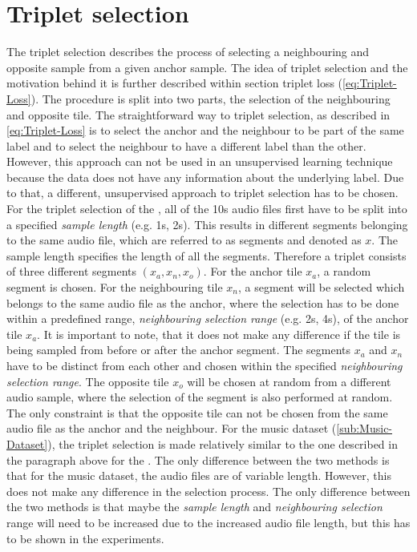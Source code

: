 \section{Triplet selection}
\label{sec:Triplet-Selection}
The triplet selection describes the process of selecting a neighbouring and opposite sample from a given anchor sample. The idea of triplet selection and the motivation behind it is further described within section triplet loss (\ref{eq:Triplet-Loss}). The procedure is split into two parts, the selection of the neighbouring and opposite tile.
\newline
\newline
The straightforward way to triplet selection, as described in \ref{eq:Triplet-Loss} is to select the anchor and the neighbour to be part of the same label and to select the neighbour to have a different label than the other. However, this approach can not be used in an unsupervised learning technique because the data does not have any information about the underlying label. Due to that, a different, unsupervised approach to triplet selection has to be chosen.
\newline
\newline
For the triplet selection of the , all of the 10s audio files first have to be split into a specified \textit{sample length} (e.g. 1s, 2s). This results in different segments belonging to the same audio file, which are referred to as segments and denoted as $x$. The sample length specifies the length of all the segments. Therefore a triplet consists of three different segments $(x_a, x_n, x_o)$.
\newline
For the anchor tile $x_a$, a random segment is chosen. For the neighbouring tile $x_n$, a segment will be selected which belongs to the same audio file as the anchor, where the selection has to be done within a predefined range, \textit{neighbouring selection range} (e.g. 2s, 4s), of the anchor tile $x_a$. It is important to note, that it does not make any difference if the tile is being sampled from before or after the anchor segment. The segments $x_a$ and $x_n$ have to be distinct from each other and chosen within the specified \textit{neighbouring selection range}.
\newline
The opposite tile $x_o$ will be chosen at random from a different audio sample, where the selection of the segment is also performed at random. The only constraint is that the opposite tile can not be chosen from the same audio file as the anchor and the neighbour.
\newline
\newline
For the music dataset (\ref{sub:Music-Dataset}), the triplet selection is made relatively similar to the one described in the paragraph above for the . The only difference between the two methods is that for the music dataset, the audio files are of variable length. However, this does not make any difference in the selection process. The only difference between the two methods is that maybe the \textit{sample length} and \textit{neighbouring selection} range will need to be increased due to the increased audio file length, but this has to be shown in the experiments.

